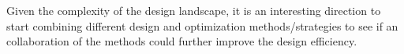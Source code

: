Given the complexity of the design landscape, it is an interesting direction to start combining different design and optimization methods/strategies to see if an collaboration of the methods could further improve the design efficiency. 



\begin{comment}
\textbf{SP}
In the examples we have examined so far, if use SPC as a global optimization tool, it should be OK to start from any of the existing solution to obtain the global optimum (or arrive at the region of the global optimia). 

To prove that the SPC network can always capture the good solutions given a design landscape. That is to say, for the region of the good solutions, the design landscape is structured in a way that SPC network is mapping the saddle point - minima network. 
It requires a deeper investigation of the design landscape. To start with, I would suggest to use a certain type of system and to characterize its landscape (in the thesis, we have been looking at wide-angle and microscope objectives). 

It is a difficult task.



In addition, since the property for SPC is not constrained to lens design using curvatures, trying to adapt it into other design and optimization area is also interesting.
1) using variables such as thickness, higher-order surface description
2) benefit of constructing higher-order saddle points
3) apply SPC in other design problem, e.g. thin film (zero-thickness, using n as variables, phase-mask)


\textbf{lens design opt}
1) In the search of lens design method, combining multiple strategies would be beneficial rather than only using one. 
Lens design optimization strategy given the complex landscape




//////////
Saddle point wise, 
1) what is the optimal construction place by comparing the curve change via the inserting positions. 

For simple system, it is interesting to see the design networks mostly related to the saddle point network. Few number of lens is used, not much constraint is applied to the system. 

For complicated system, mapping the network via saddle point becomes less value-added. What is sure the basic saddle point-minima approach is mostly fulfilled. 


\end{comment}
